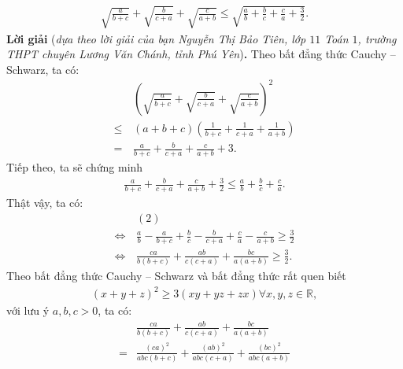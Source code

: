 \begin{multicols}{2}
	\begin{align*}
		\sqrt{\!\!\frac{a}{b\!+\!c}}\!+\!\sqrt{\!\!\frac{b}{c\!+\!a}}\!+\!\sqrt{\!\!\frac{c}{a\!+\!b}}
		\!\leq\! \sqrt{\!\!\frac{a}{b}\!+\!\frac{b}{c}\!+\!\frac{c}{a}\!+\!\frac{3}{2}} .
	\end{align*}
	\textbf{\color{thachthuctoanhoc}Lời giải} (\textit{dựa theo lời giải của bạn Nguyễn Thị Bảo Tiên, lớp $11$ Toán $1$, trường THPT chuyên Lương Văn Chánh, tỉnh Phú Yên})\textbf{\color{thachthuctoanhoc}.}
	\vskip 0.05cm
	Theo bất đẳng thức Cauchy -- Schwarz, ta có:
	\begin{align*}
		&{\left( {\sqrt {\frac{a}{{b + c}}}  + \sqrt {\frac{b}{{c + a}}}  + \sqrt {\frac{c}{{a + b}}} } \right)^2} \\
		\le \,&(a + b + c)\left( {\frac{1}{{b + c}} + \frac{1}{{c + a}} + \frac{1}{{a + b}}} \right) \\
		= \,&\frac{a}{{b + c}} + \frac{b}{{c + a}} + \frac{c}{{a + b}} + 3. \tag{$1$}
	\end{align*}
	Tiếp theo, ta sẽ chứng minh
	\begin{align*}
		\frac{a}{{b \!+\! c}} \!+\! \frac{b}{{c \!+\! a}} \!+\! \frac{c}{{a \!+\! b}} \!+\! \frac{3}{2} \!\le\! \frac{a}{b} \!+\! \frac{b}{c} \!+\! \frac{c}{a}.\tag{$2$}
	\end{align*}
	Thật vậy, ta có:
	\begin{align*}
		&(2) \\[-0.5ex]
		\Leftrightarrow \,&\frac{a}{b} \!-\! \frac{a}{{b \!+\! c}} \!+\! \frac{b}{c} \!-\! \frac{b}{{c \!+\! a}} \!+\! \frac{c}{a} \!-\! \frac{c}{{a \!+\! b}} \!\ge\! \frac{3}{2}\\[-0.5ex]
		\Leftrightarrow \,&\frac{{ca}}{{b\left( {b \!+\! c} \right)}} \!+\! \frac{{ab}}{{c\left( {c \!+\! a} \right)}} \!+\! \frac{{bc}}{{a\left( {a \!+\! b} \right)}} \!\ge\! \frac{3}{2}.\! \tag{$3$}
	\end{align*}
	Theo bất đẳng thức Cauchy -- Schwarz và bất đẳng thức rất quen biết
	\begin{align*}
		{\left( {x + y + z} \right)^2} \ge 3\left( {xy + yz + zx} \right)\forall x,y,z \in  \mathbb{R},
	\end{align*}
	với lưu ý $a, b, c > 0$, ta có:
	\begin{align*}
			&\frac{{ca}}{{b\left( {b + c} \right)}} + \frac{{ab}}{{c\left( {c + a} \right)}} + \frac{{bc}}{{a\left( {a + b} \right)}} \\[-0.5ex]
			= &\frac{{{{\left( {ca} \right)}^2}}}{{abc\left( {b + c} \right)}} + \frac{{{{\left( {ab} \right)}^2}}}{{abc\left( {c + a} \right)}} + \frac{{{{\left( {bc} \right)}^2}}}{{abc\left( {a + b} \right)}}\\[-0.5ex]

\end{align*}
\end{multicols}
